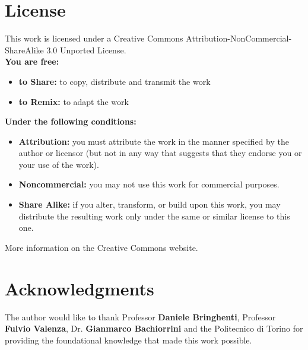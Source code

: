 \section*{License}

This work is licensed under a Creative Commons Attribution-NonCommercial-ShareAlike 3.0 Unported License.\\

\noindent
\textbf{You are free:}
\begin{itemize}
    \item \textbf{to Share:} to copy, distribute and transmit the work
    \item \textbf{to Remix:} to adapt the work
\end{itemize}

\textbf{Under the following conditions:}
\begin{itemize}
    \item \textbf{Attribution:} you must attribute the work in the manner specified by the author or licensor (but not in any way that suggests that they endorse you or your use of the work).
    \item \textbf{Noncommercial:} you may not use this work for commercial purposes.
    \item \textbf{Share Alike:} if you alter, transform, or build upon this work, you may distribute the resulting work only under the same or similar license to this one.
\end{itemize}

More information on the Creative Commons website.

\section*{Acknowledgments}

The author would like to thank Professor \textbf{Daniele Bringhenti}, Professor \textbf{Fulvio Valenza}, Dr. \textbf{Gianmarco Bachiorrini} and the Politecnico di Torino for providing the foundational knowledge that made this work possible.
